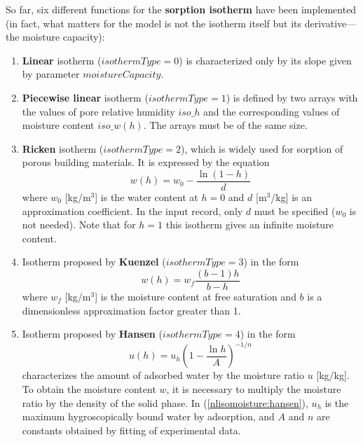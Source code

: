 \documentclass[a4paper]{article}
\begin{document}
So far, six different functions for the {\bf sorption
isotherm} have been implemented  (in fact, what matters for the model
is not the isotherm itself but its derivative---the moisture capacity):
\begin{enumerate}

\item
{\bf Linear} isotherm ($isothermType=0$) is characterized only by its
slope given by parameter $moistureCapacity$.

\item
{\bf Piecewise linear} isotherm ($isothermType=1$) is defined by two 
arrays
with the values of pore relative humidity $iso\_h$ and the
corresponding values of moisture content $iso\_w(h)$. The arrays must be of
the same size. 

\item
{\bf Ricken} isotherm \cite{Kuenzel}
($isothermType=2$), which is widely used for sorption of porous building
materials. It is
expressed by the equation
\begin{equation}\label{nlisomoisture:ricken}
w(h) = w_0 - \frac{\ln(1-h)}{d}
\end{equation} 
where $w_0$ [kg/m$^3$] is the water content at $h=0$ and $d$ [m$^3$/kg] is
an approximation coefficient. In the input record, only $d$ must be specified 
($w_0$ is not needed). Note that for $h=1$ this isotherm
gives an infinite moisture content. 

\item
Isotherm proposed by {\bf Kuenzel} \cite{Kuenzel} ($isothermType=3$) 
in the form 
\begin{equation}\label{nlisomoisture:kuenzel}
w(h) = w_f \frac{(b-1)h}{b-h}
\end{equation} 
where $w_f$ [kg/m$^3$] is the moisture content at free saturation and
$b$ is a dimensionless approximation factor greater than 1.

\item
Isotherm proposed by {\bf Hansen} \cite{Hansen} ($isothermType=4$) in the form
\begin{equation}\label{nlisomoisture:hansen}
u(h) = u_h \left(1- \frac{\ln h}{A} \right)^{-1/n}
\end{equation} 
characterizes the amount of adsorbed water 
by the moisture ratio $u$ [kg/kg]. To obtain the
moisture content $w$, it is necessary to multiply the moisture ratio
by the density of the solid phase. In (\ref{nlisomoisture:hansen}),
 $u_h$ is the maximum hygroscopically
bound water by adsorption, and $A$ and $n$ are constants
obtained by fitting of experimental data.


\end{enumerate}
\end{document}
